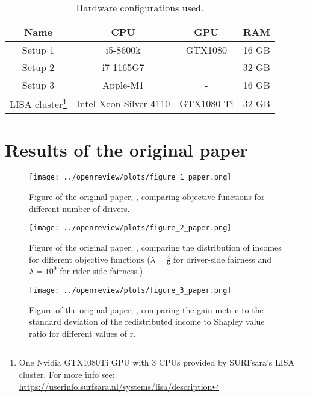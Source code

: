 \begin{table}[!htbp]
\begin{minipage}{\textwidth}
\centering

    \centering
    \begin{tabular}{| c | c | c | c |}
    \hline 
        \textbf{Name} & \textbf{CPU} & \textbf{GPU} & \textbf{RAM} \\
        \hline 
        Setup 1 & i5-8600k & GTX1080 & 16 GB \\
        Setup 2 & i7-1165G7 & - & 32 GB \\ 
        Setup 3 & Apple-M1 & - & 16 GB \\
        LISA cluster\footnote{One Nvidia GTX1080Ti GPU with 3 CPUs provided by SURFsara’s LISA cluster. For more info see: \url{ https://userinfo.surfsara.nl/systems/lisa/description} }  & Intel Xeon Silver 4110 & GTX1080 Ti & 32 GB\\
        \hline 
    \end{tabular}
    \caption{Hardware configurations used.}
    \label{tabl:hw_conf}

\end{minipage}

\end{table}


\section{Results of the original paper}\label{sec:Results of the original paper}

\begin{figure}[!htbp]
    \centering
    \texttt{[image: ../openreview/plots/figure\_1\_paper.png]}
    \caption{Figure of the original paper, \citet{raman21}, comparing objective functions for different number of drivers.}
    \label{fig:drivernrcomp_orig}
\end{figure}

\begin{figure}[!htbp]
    \centering
    \texttt{[image: ../openreview/plots/figure\_2\_paper.png]}
    \caption{Figure of the original paper, \citet{raman21}, comparing the distribution of incomes for different objective functions  ($\lambda=\frac{4}{6}$ for driver-side fairness and $\lambda=10^9$ for rider-side fairness.)}
    \label{fig:incomedistrcomp-orig}
\end{figure}

\begin{figure}[H]
    \centering
    \texttt{[image: ../openreview/plots/figure\_3\_paper.png]}
    \caption{Figure of the original paper, \citet{raman21}, comparing the gain metric to the standard deviation of the redistributed income to Shapley value ratio for different values of r.}
    \label{fig:redist-orig}
\end{figure}

